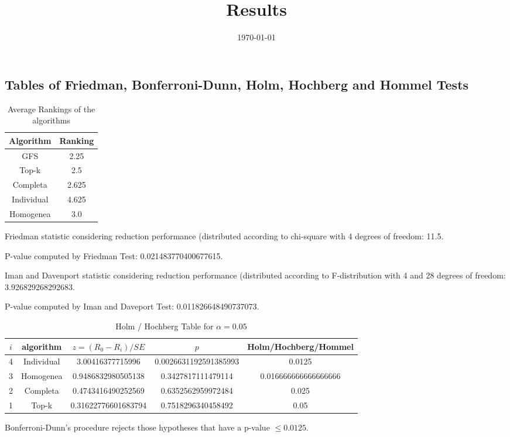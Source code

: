 \documentclass[a4paper,10pt]{article}
\title{Results}
\author{}
\date{\today}
\begin{document}
\begin{landscape}
\oddsidemargin 0in \topmargin 0in\maketitle
\section{Tables of Friedman, Bonferroni-Dunn, Holm, Hochberg and Hommel Tests}
\begin{table}[!htp]
\centering
\caption{Average Rankings of the algorithms
}\begin{tabular}{c|c}
Algorithm&Ranking\\
\hline
GFS&2.25\\
Top-k&2.5\\
Completa&2.625\\
Individual&4.625\\
Homogenea&3.0\\
\end{tabular}
\end{table}


Friedman statistic considering reduction performance (distributed according to chi-square with 4 degrees of freedom: 11.5.


P-value computed by Friedman Test: 0.021483770400677615.\newline

Iman and Davenport statistic considering reduction performance (distributed according to F-distribution with 4 and 28 degrees of freedom: 3.926829268292683.


P-value computed by Iman and Daveport Test: 0.011826648490737073.\newline

\begin{table}[!htp]
\centering\tiny
\caption{Holm / Hochberg Table for $\alpha=0.05$}
\begin{tabular}{ccccc}
$i$&algorithm&$z=(R_0 - R_i)/SE$&$p$&Holm/Hochberg/Hommel\\
\hline
4&Individual&3.00416377715996&0.0026631192591385993&0.0125\\
3&Homogenea&0.9486832980505138&0.3427817111479114&0.016666666666666666\\
2&Completa&0.4743416490252569&0.6352562959972484&0.025\\
1&Top-k&0.31622776601683794&0.7518296340458492&0.05\\
\hline
\end{tabular}
\end{table}
Bonferroni-Dunn's procedure rejects those hypotheses that have a p-value $\le0.0125$.



\end{landscape}
\end{document}
